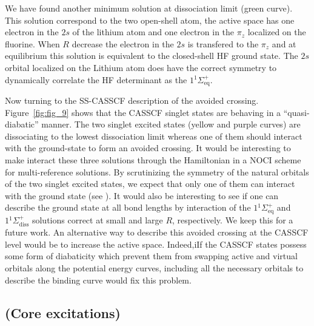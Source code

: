 \documentclass[aip,jcp,reprint,noshowkeys,superscriptaddress]{revtex4-1}
\begin{document}
We have found another minimum solution at dissociation limit (green curve).
This solution correspond to the two open-shell atom, the active space has one electron in the $2s$ of the lithium atom and one electron in the $\pi_z$ localized on the fluorine.
When $R$ decrease the electron in the $2s$ is transfered to the $\pi_z$ and at equilibrium this solution is equivalent to the closed-shell HF ground state.
The $2s$ orbital localized on the Lithium atom does have the correct symmetry to dynamically correlate the HF determinant as the $1 {}^1\Sigma^+_{\text{eq}}$.

Now turning to the SS-CASSCF description of the avoided crossing.
Figure~\ref{fig:fig_9} shows that the CASSCF singlet states are behaving in a ``quasi-diabatic'' manner.
The two singlet excited states (yellow and purple curves) are dissociating to the lowest dissociation limit whereas one of them should interact with the ground-state to form an avoided crossing.
It would be interesting to make interact these three solutions through the Hamiltonian in a NOCI scheme for multi-reference solutions.
By scrutinizing the symmetry of the natural orbitals of the two singlet excited states, we expect that only one of them can interact with the ground state (see \SupInf).
It would also be interesting to see if one can describe the ground state at all bond lengths by interaction of the $1 {}^1\Sigma^+_{\text{eq}}$ and $1 {}^1\Sigma^+_{\text{diss}}$ solutions correct at small and large $R$, respectively.
We keep this for a future work.
An alternative way to describe this avoided crossing at the CASSCF level would be to increase the active space.
Indeed,iIf the CASSCF states possess some form of diabaticity which prevent them from swapping active and virtual orbitals along the potential energy curves, including all the necessary orbitals to describe the binding curve would fix this problem. 

\subsection{(Core excitations)}
\label{sec:core}
\end{document}
